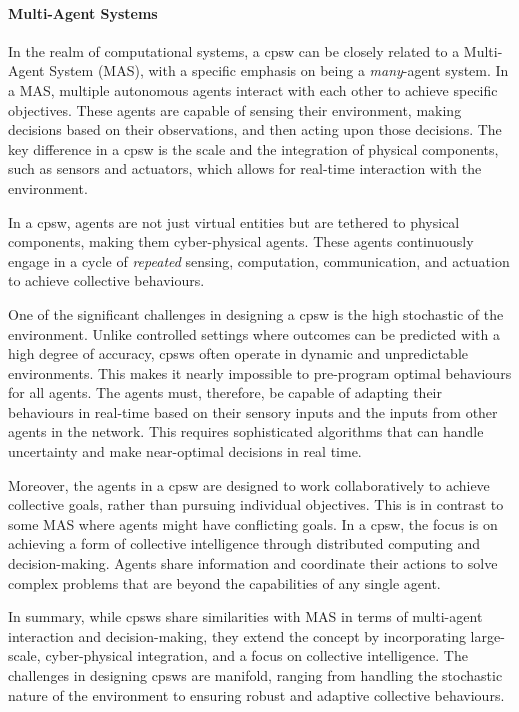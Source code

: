 \paragraph*{Multi-Agent Systems}
In the realm of computational systems, a \ac{cpsw} can be closely related to a Multi-Agent System (MAS), 
 with a specific emphasis on being a \emph{many}-agent system. 
 In a MAS, multiple autonomous agents interact with each other to achieve specific objectives. 
 These agents are capable of sensing their environment, making decisions based on their observations, and then acting upon those decisions. 
 The key difference in a \ac{cpsw} is the scale and the integration of physical components, such as sensors and actuators, which allows for real-time interaction with the environment.

In a \ac{cpsw}, agents are not just virtual entities but are tethered to physical components, making them cyber-physical agents. 
 These agents continuously engage in a cycle of \emph{repeated} sensing, computation, communication, and actuation to achieve collective behaviours. 

One of the significant challenges in designing a \ac{cpsw} is the high stochastic of the environment. 
 Unlike controlled settings where outcomes can be predicted with a high degree of accuracy, \acp{cpsw} often operate in dynamic and unpredictable environments. 
 This makes it nearly impossible to pre-program optimal behaviours for all agents. 
 The agents must, therefore, be capable of adapting their behaviours in real-time based on their sensory inputs and the inputs from other agents in the network. 
 This requires sophisticated algorithms that can handle uncertainty and make near-optimal decisions in real time.

Moreover, the agents in a \ac{cpsw} are designed to work collaboratively to achieve collective goals, 
 rather than pursuing individual objectives. 
 This is in contrast to some MAS where agents might have conflicting goals. 
 In a \ac{cpsw}, the focus is on achieving a form of collective intelligence through distributed computing and decision-making. 
 Agents share information and coordinate their actions to solve complex problems that are beyond the capabilities of any single agent.

In summary, while \acp{cpsw} share similarities with MAS in terms of multi-agent interaction and decision-making, they extend the concept by incorporating large-scale, cyber-physical integration, and a focus on collective intelligence. 
 The challenges in designing \acp{cpsw} are manifold, ranging from handling the stochastic nature of the environment to ensuring robust and adaptive collective behaviours.

